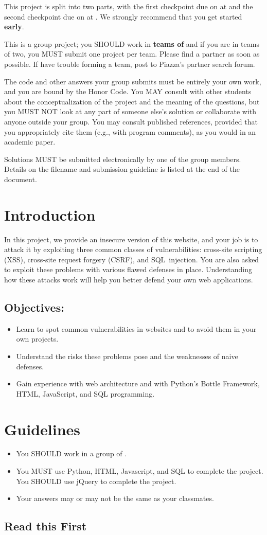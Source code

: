 \documentclass[letterpaper,12pt]{report}
\newcommand{\htitle}
{
     \noindent\parbox{\textwidth}
    {
        \course\hfill \distdate\newline
        \coursename\hfill 
        \settitle \vspace*{-.5ex}\newline
        \mbox{}\hrulefill\mbox{}
    }
    \vspace{8pt}
    \begin{center}{\Large\bf{\settitle}}\end{center}
}
\newcommand{\handout}
{
    \thispagestyle{empty}
    \markboth{}{}
    \pagestyle{plain}
    \htitle
}
\newcommand{\problemsetheader}
{
\setlength{\parindent}{0pt}

This project is split into two parts, with the first checkpoint due on {\bf \checkpointduedate} at {\bf \duetime} and the second checkpoint due on {\bf \duedate} at {\bf \duetime}. We strongly recommend that you get started {\bf early}. 
\medskip

This is a group project; you SHOULD work in \textbf{teams of \numberingroup} and if you are in teams of two, you MUST submit one project per team.  Please find a partner as soon as possible.  If have trouble forming a team, post to Piazza's partner search forum.

\medskip

The code and other answers your group submits must be entirely your own work, and you are bound by the Honor Code.  You MAY consult with other students about the conceptualization of the project and the meaning of the questions, but you MUST NOT look at any part of someone else's solution or collaborate with anyone outside your group.  You may consult published references, provided that you appropriately cite them (e.g., with program comments), as you would in an academic paper.

\medskip

Solutions MUST be submitted electronically by one of the group members. Details on the filename and submission guideline is listed at the end of the document.

\medskip

\hrulefill

\medskip

}
\begin{document}
\handout
\problemsetheader


\vspace{-6pt}
\section*{Introduction}
In this project, we provide an insecure version of this website, and your job is to attack it by exploiting three common classes of vulnerabilities: cross-site scripting (XSS), cross-site request forgery (CSRF), and SQL~injection. You are also asked to exploit these problems with various flawed defenses in place. Understanding how these attacks work will help you better defend your own web applications.\newline

\subsection*{Objectives:}

\begin{itemize}
\item Learn to spot common vulnerabilities in websites and to avoid them in your own projects.
\item Understand the risks these problems pose and the weaknesses of naive defenses.
\item Gain experience with web architecture and with Python's Bottle Framework, HTML, JavaScript, and SQL programming.
\end{itemize}

\section*{Guidelines}
\begin{itemize}
\item You SHOULD work in a group of \numberingroup.
\item You MUST use Python, HTML, Javascript, and SQL to complete the project. You SHOULD use jQuery to complete the project.
\item Your answers may or may not be the same as your classmates.
\end{itemize}

\smallskip

\subsection*{Read this First}
\end{document}
